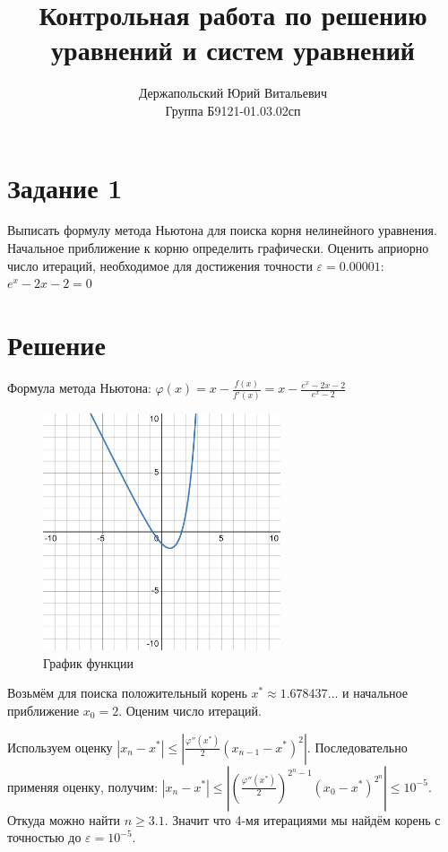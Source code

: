 \documentclass[14pt, a4paper, titlepage, fleqn]{extarticle}
\title{Контрольная работа по решению уравнений и систем уравнений}
\author{Держапольский Юрий Витальевич \\ Группа Б9121-01.03.02сп}
\date{}
\begin{document}
    \maketitle

    \section*{Задание 1}
        Выписать формулу метода Ньютона для поиска корня нелинейного уравнения. Начальное приближение к корню определить графически. Оценить априорно число итераций, необходимое для достижения точности \( \varepsilon = 0.00001 \): \\
        \( e^x - 2x - 2 = 0 \)
    \section*{Решение}
        Формула метода Ньютона:
        \( \varphi(x) = x - \frac{f(x)}{f'(x)} = x - \frac{e^{x} - 2x - 2}{e^{x} - 2} \)
        
        \begin{figure}[H]
            \centering
            \includegraphics[width=7cm]{z1.pdf}
            \caption{График функции}
        \end{figure}

        Возьмём для поиска положительный корень \( x^* \approx 1.678437\dots \) и начальное приближение \( x_0 = 2 \). Оценим число итераций.

        Используем оценку \( | x_n - x^* | \leq \left| \frac{\varphi''(x^*)}{2} (x_{n-1} - x^*)^2 \right| \). Последовательно применяя оценку, получим: \( | x_n - x^* | \leq \left| \left(\frac{\varphi''(x^*)}{2} \right)^{2^n -1} (x_{0} - x^*)^{2^n} \right| \leq 10^{-5} \). Откуда можно найти \( n \geq 3.1 \). Значит что 4-мя итерациями мы найдём корень с точностью до \( \varepsilon = 10^{-5} \).
\end{document}
